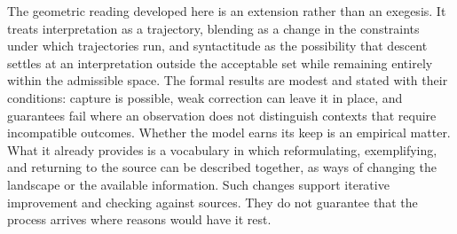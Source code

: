 \documentclass[11pt]{article}
\begin{document}
The geometric reading developed here is an extension rather than an exegesis. It treats interpretation as a trajectory, blending as a change in the constraints under which trajectories run, and syntactitude as the possibility that descent settles at an interpretation outside the acceptable set while remaining entirely within the admissible space. The formal results are modest and stated with their conditions: capture is possible, weak correction can leave it in place, and guarantees fail where an observation does not distinguish contexts that require incompatible outcomes. Whether the model earns its keep is an empirical matter. What it already provides is a vocabulary in which reformulating, exemplifying, and returning to the source can be described together, as ways of changing the landscape or the available information. Such changes support iterative improvement and checking against sources. They do not guarantee that the process arrives where reasons would have it rest.
\end{document}
